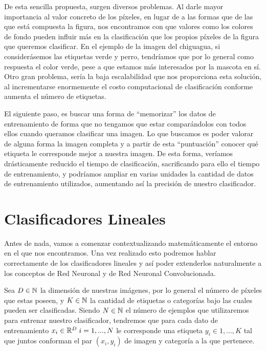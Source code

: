 De esta sencilla propuesta, surgen diversos problemas. Al darle mayor importancia al valor concreto de los píxeles, en lugar de a las formas que de las que está compuesta la figura, nos encontramos con que valores como los colores de fondo pueden influir más en la clasificación que los propios píxeles de la figura que queremos clasificar. En el ejemplo de la imagen del chiguagua, si considerásemos las etiquetas verde y perro, tendríamos que por lo general como respuesta el color verde, pese a que estamos más interesados por la mascota en sí. Otro gran problema, sería la baja escalabilidad que nos proporciona esta solución, al incrementarse enormemente el costo computacional de clasificación conforme aumenta el número de etiquetas.\newline

El siguiente paso, es buscar una forma de ``memorizar'' los datos de entrenamiento de forma que no tengamos que estar comparándolos con todos ellos cuando queramos clasificar una imagen. Lo que buscamos es poder valorar de alguna forma la imagen completa y a partir de esta ``puntuación'' conocer qué etiqueta le corresponde mejor a nuestra imagen. De esta forma, veríamos drásticamente reducido el tiempo de clasificación, sacrificando para ello el tiempo de entrenamiento, y podríamos ampliar en varias unidades la cantidad de datos de entrenamiento utilizados, aumentando así la precisión de nuestro clasificador.

\section{Clasificadores Lineales}

Antes de nada, vamos a comenzar contextualizando matemáticamente el entorno en el que nos encontramos. Una vez realizado esto podremos hablar correctamente de los clasificadores lineales y así poder extenderlos naturalmente a los conceptos de Red Neuronal y de Red Neuronal Convolucionada.\newline

Sea $D \in \mathbb{N}$ la dimensión de nuestras imágenes, por lo general el número de píxeles que estas poseen, y $K \in \mathbb{N}$ la cantidad de etiquetas o categorías bajo las cuales pueden ser clasificadas. Siendo $N \in \mathbb{N}$ el número de ejemplos que utilizaremos para entrenar nuestro clasificador, tendremos que para cada dato de entrenamiento $x_i \in \mathbb{R}^D \; i=1,...,N$ le corresponde una etiqueta $y_i \in 1,...,K$ tal que juntos conforman el par $(x_i,y_i)$ de imagen y categoría a la que pertenece.\newline

